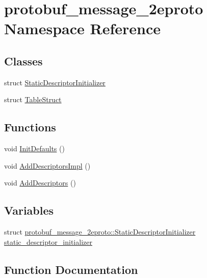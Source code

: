 \hypertarget{namespaceprotobuf__message__2eproto}{}\section{protobuf\+\_\+message\+\_\+2eproto Namespace Reference}
\label{namespaceprotobuf__message__2eproto}
\subsection*{Classes}
\begin{DoxyCompactItemize}
\item 
struct \hyperlink{structprotobuf__message__2eproto_1_1_static_descriptor_initializer}{Static\+Descriptor\+Initializer}
\item 
struct \hyperlink{structprotobuf__message__2eproto_1_1_table_struct}{Table\+Struct}
\end{DoxyCompactItemize}
\subsection*{Functions}
\begin{DoxyCompactItemize}
\item 
void \hyperlink{namespaceprotobuf__message__2eproto_a0904ee0f747524cc1986baf4a9e9b3af}{Init\+Defaults} ()
\item 
void \hyperlink{namespaceprotobuf__message__2eproto_a2e03bfe5373fdbf0a2bb488e51de0c19}{Add\+Descriptors\+Impl} ()
\item 
void \hyperlink{namespaceprotobuf__message__2eproto_a6141a47817b5c3560ccd3f3396656732}{Add\+Descriptors} ()
\end{DoxyCompactItemize}
\subsection*{Variables}
\begin{DoxyCompactItemize}
\item 
struct \hyperlink{structprotobuf__message__2eproto_1_1_static_descriptor_initializer}{protobuf\+\_\+message\+\_\+2eproto\+::\+Static\+Descriptor\+Initializer} \hyperlink{namespaceprotobuf__message__2eproto_a326463751c85e569b98ef24ea8a840c9}{static\+\_\+descriptor\+\_\+initializer}
\end{DoxyCompactItemize}


\subsection{Function Documentation}
